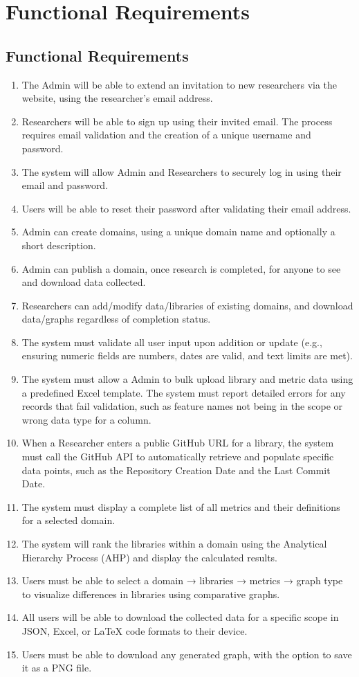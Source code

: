 \documentclass[12pt]{article}
\begin{document}
\section{Functional Requirements}
\subsection{Functional Requirements}
\begin{enumerate}[label=FR\arabic*]
  \item The Admin will be able to extend an invitation to new researchers via the website, using the researcher's email address.
  \item Researchers will be able to sign up using their invited email. The process requires email validation and the creation of a unique username and password.
  \item The system will allow Admin and Researchers to securely log in using their email and password.
  \item Users will be able to reset their password after validating their email address.
  \item Admin can create domains, using a unique domain name and optionally a short description.
  \item Admin can publish a domain, once research is completed, for anyone to see and download data collected.
  \item Researchers can add/modify data/libraries of existing domains, and download data/graphs regardless of completion status.
  \item The system must validate all user input upon addition or update (e.g., ensuring numeric fields are numbers, dates are valid, and text limits are met).	
  \item The system must allow a Admin to bulk upload library and metric data using a predefined Excel template. The system must report detailed errors for any records that fail validation, such as feature names not being in the scope or wrong data type for a column.
  \item When a Researcher enters a public GitHub URL for a library, the system must call the GitHub API to automatically retrieve and populate specific data points, such as the Repository Creation Date and the Last Commit Date.
  \item The system must display a complete list of all metrics and their definitions for a selected domain.
  \item The system will rank the libraries within a domain using the Analytical Hierarchy Process (AHP) and display the calculated results.
  \item Users must be able to select a domain → libraries → metrics → graph type to visualize differences in libraries using comparative graphs.
  \item All users will be able to download the collected data for a specific scope in JSON, Excel, or LaTeX code formats to their device.
  \item Users must be able to download any generated graph, with the option to save it as a PNG file.
\end{enumerate}
\end{document}
